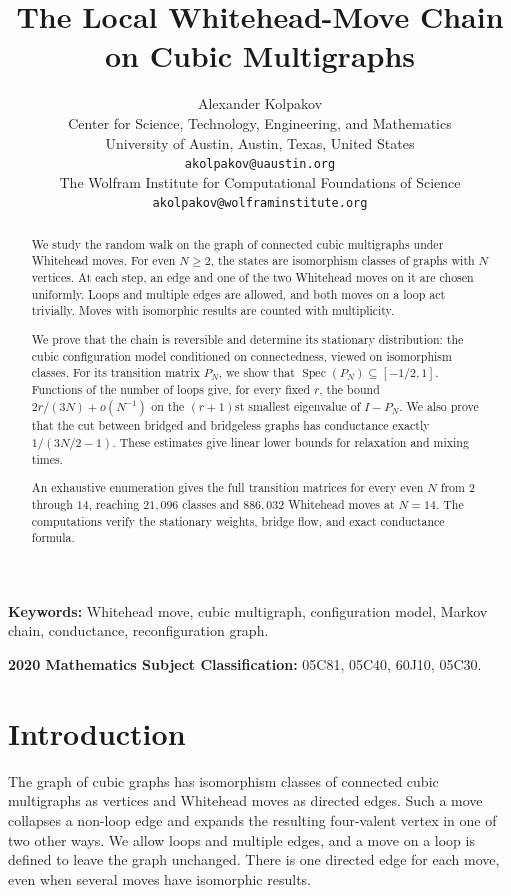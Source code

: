 \documentclass[11pt]{article}
\title{The Local Whitehead-Move Chain on Cubic Multigraphs}
\author{Alexander Kolpakov\\[0.5ex]
\small Center for Science, Technology, Engineering, and Mathematics\\
\small University of Austin, Austin, Texas, United States\\
\small \texttt{akolpakov@uaustin.org}\\[0.75ex]
\small The Wolfram Institute for Computational Foundations of Science\\
\small \texttt{akolpakov@wolframinstitute.org}}
\date{}
\newcommand{\Spec}{\operatorname{Spec}}
\theoremstyle{plain}
\theoremstyle{definition}
\numberwithin{equation}{section}
\begin{document}
\maketitle

\begin{abstract}
We study the random walk on the graph of connected cubic multigraphs under
Whitehead moves.  For even $N\geq2$, the states are isomorphism classes of
graphs with $N$ vertices.  At each step, an edge and one of the two Whitehead
moves on it are chosen uniformly.  Loops and multiple edges are allowed, and
both moves on a loop act trivially.  Moves with isomorphic results are counted
with multiplicity.

We prove that the chain is reversible and determine its stationary
distribution: the cubic configuration model conditioned on connectedness,
viewed on isomorphism classes.  For its transition matrix $P_N$, we show that
$\Spec(P_N)\subseteq[-1/2,1]$.  Functions of the number of loops give, for
every fixed $r$, the bound $2r/(3N)+o(N^{-1})$ on the $(r+1)$st smallest
eigenvalue of $I-P_N$.  We also prove that the cut between bridged and
bridgeless graphs has conductance exactly $1/(3N/2-1)$.  These estimates give
linear lower bounds for relaxation and mixing times.

An exhaustive enumeration gives the full transition matrices for every even
$N$ from $2$ through $14$, reaching $21{,}096$ classes and $886{,}032$
Whitehead moves at $N=14$.  The computations verify the stationary weights,
bridge flow, and exact conductance formula.
\end{abstract}

\noindent\textbf{Keywords:} Whitehead move, cubic multigraph, configuration
model, Markov chain, conductance, reconfiguration graph.

\noindent\textbf{2020 Mathematics Subject Classification:}
05C81, 05C40, 60J10, 05C30.

\section{Introduction}

The graph of cubic graphs has isomorphism classes of connected cubic
multigraphs as vertices and Whitehead moves as directed edges.  Such a move
collapses a non-loop edge and expands the resulting four-valent vertex in one
of two other ways.  We allow loops and multiple edges, and a move on a loop is
defined to leave the graph unchanged.  There is one directed edge for each
move, even when several moves have isomorphic results.
\end{document}
